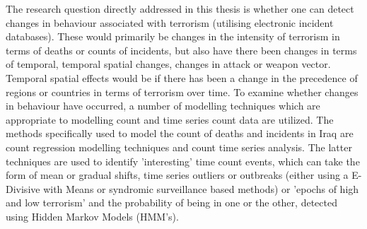 The research question directly addressed in this thesis is whether one can detect changes in behaviour associated with terrorism (utilising electronic incident databases). These would primarily be changes in the intensity of terrorism in terms of deaths or counts of incidents, but also have there been changes in terms of temporal, temporal spatial changes, changes in attack or weapon vector. Temporal spatial effects would be if there has been a change in the precedence of regions or countries in terms of terrorism over time. To examine whether changes in behaviour have occurred, a number of modelling techniques which are appropriate to modelling count and time series count data are utilized. The methods specifically used to model the count of deaths and incidents in Iraq are count regression modelling techniques and count time series analysis. The latter techniques are used to identify 'interesting' time count events, which can take the form of mean or gradual shifts, time series outliers or outbreaks (either using a E-Divisive with Means or syndromic surveillance based methods) or 'epochs of high and low terrorism' and the probability of being in one or the other, detected using Hidden Markov Models (HMM's).      


